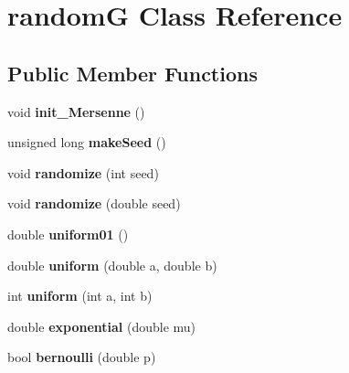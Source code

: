 \hypertarget{classrandomG}{\section{random\-G \-Class \-Reference}
\label{classrandomG}
}
\subsection*{\-Public \-Member \-Functions}
\begin{DoxyCompactItemize}
\item 
\hypertarget{classrandomG_af28f5f421bfef15819f47e2aacc71e21}{void {\bfseries init\-\_\-\-Mersenne} ()}\label{classrandomG_af28f5f421bfef15819f47e2aacc71e21}

\item 
\hypertarget{classrandomG_a6f5f2eb26c6a99b6e51435805ea89716}{unsigned long {\bfseries make\-Seed} ()}\label{classrandomG_a6f5f2eb26c6a99b6e51435805ea89716}

\item 
\hypertarget{classrandomG_a76f1322d2cb10808dab2ed01198ea46b}{void {\bfseries randomize} (int seed)}\label{classrandomG_a76f1322d2cb10808dab2ed01198ea46b}

\item 
\hypertarget{classrandomG_aa11ea68ab6b8cd2f1bc1418f5bbe1da5}{void {\bfseries randomize} (double seed)}\label{classrandomG_aa11ea68ab6b8cd2f1bc1418f5bbe1da5}

\item 
\hypertarget{classrandomG_ab974bac63bf7bcad7b546a433d7ed50e}{double {\bfseries uniform01} ()}\label{classrandomG_ab974bac63bf7bcad7b546a433d7ed50e}

\item 
\hypertarget{classrandomG_a87deac9831982888dc4d10f545e03c46}{double {\bfseries uniform} (double a, double b)}\label{classrandomG_a87deac9831982888dc4d10f545e03c46}

\item 
\hypertarget{classrandomG_a6acec53b6bcfab8da54c3fb40ec22766}{int {\bfseries uniform} (int a, int b)}\label{classrandomG_a6acec53b6bcfab8da54c3fb40ec22766}

\item 
\hypertarget{classrandomG_ab16472e583980e449d6f1e5db680e305}{double {\bfseries exponential} (double mu)}\label{classrandomG_ab16472e583980e449d6f1e5db680e305}

\item 
\hypertarget{classrandomG_a56028f989a19363b5499483aedfd397f}{bool {\bfseries bernoulli} (double p)}\label{classrandomG_a56028f989a19363b5499483aedfd397f}


\end{DoxyCompactItemize}

